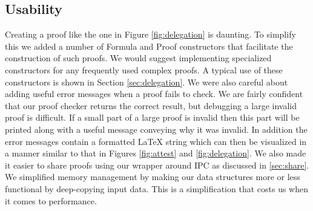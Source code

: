 \documentclass[10pt]{article}
\begin{document}
\subsection{Usability}
Creating a proof like the one in Figure \ref{fig:delegation} is daunting.  To simplify this we added a number of Formula and Proof constructors that facilitate the construction of such proofs.  We would suggest implementing specialized constructors for any frequently used complex proofs.  A typical use of these constructors is shown in Section \ref{sec:delegation}.
\newline\newline 
We were also careful about adding useful error messages when a proof fails to check.  We are fairly confident that our proof checker returns the correct result, but debugging a large invalid proof is difficult.  If a small part of a large proof is invalid then this part will be printed along with a useful message conveying why it was invalid.  In addition the error messages contain a formatted \LaTeX{ }string which can then be visualized in a manner similar to that in Figures \ref{fig:attest} and \ref{fig:delegation}.
\newline\newline
We also made it easier to share proofs using our wrapper around IPC as discussed in \ref{sec:share}.  We simplified memory management by making our data structures more or less functional by deep-copying input data.  This is a simplification that costs us when it comes to performance.
\end{document}
